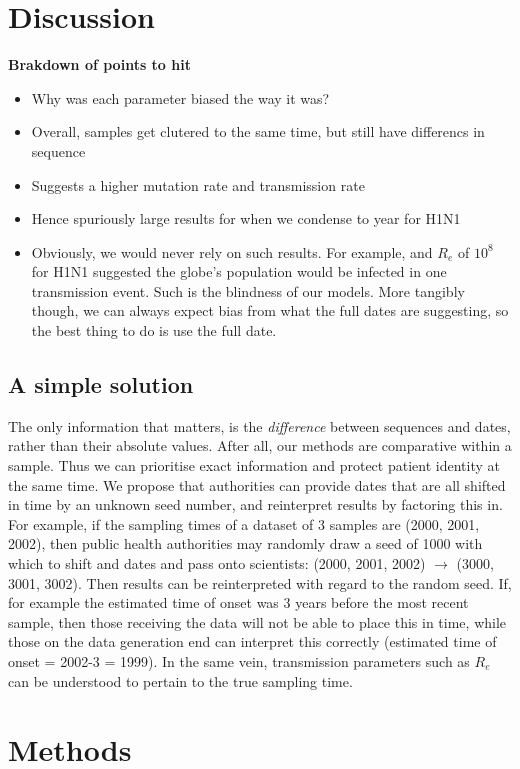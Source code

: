 \documentclass{article}
\begin{document}
\begin{spacing}{1.5}
\section*{Discussion}
\textbf{Brakdown of points to hit}
\begin{itemize}
    \item Why was each parameter biased the way it was?
    \item Overall, samples get clutered to the same time, but still have differencs in sequence
    \item Suggests a higher mutation rate and transmission rate
    \item Hence spuriously large results for when we condense to year for H1N1
    \item Obviously, we would never rely on such results. For example, and $R_e$ of $10^8$ for H1N1 suggested the globe's population would be infected in one transmission event. Such is the blindness of our models. More tangibly though, we can always expect bias from what the full dates are suggesting, so the best thing to do is use the full date.
\end{itemize}
\subsection*{A simple solution}
The only information that matters, is the \emph{difference} between sequences and dates, rather than their absolute values. After all, our methods are comparative within a sample. Thus we can prioritise exact information and protect patient identity at the same time. We propose that authorities can provide dates that are all shifted in time by an unknown seed number, and reinterpret results by factoring this in. For example, if the sampling times of a dataset of 3 samples are (2000, 2001, 2002), then public health authorities may randomly draw a seed of 1000 with which to shift and dates and pass onto scientists: (2000, 2001, 2002) $\rightarrow$ (3000, 3001, 3002). Then results can be reinterpreted with regard to the random seed. If, for example the estimated time of onset was 3 years before the most recent sample, then those receiving the data will not be able to place this in time, while those on the data generation end can interpret this correctly (estimated time of onset = 2002-3 = 1999). In the same vein, transmission parameters such as $R_e$ can be understood to pertain to the true sampling time.


\section*{Methods}

\end{spacing}
\end{document}
